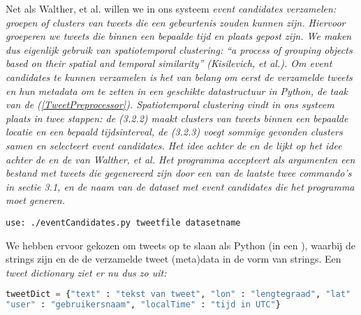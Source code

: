 {{Net als Walther, et al. willen we in ons systeem \it{event candidates} verzamelen: 
groepen of clusters van tweets die een gebeurtenis zouden kunnen zijn. Hiervoor 
groeperen we tweets die binnen een bepaalde tijd en plaats gepost zijn. We maken 
dus eigenlijk gebruik van \it{spatiotemporal clustering}: \it{“a process of grouping 
objects based on their spatial and temporal similarity”} (Kisilevich, et al.). 
\vl
Om event candidates te kunnen verzamelen is het van belang om eerst de 
verzamelde tweets en hun metadata om te zetten in een geschikte datastructuur in 
Python, de taak van de  (\ref{TweetPreprocessor}). Spatiotemporal clustering 
vindt in ons systeem plaats in twee stappen: de  (3.2.2) maakt 
clusters van tweets binnen een bepaalde locatie en een bepaald tijdsinterval, de 
 (3.2.3) voegt sommige gevonden clusters samen en selecteert event 
candidates.  Het idee achter de  en de  lijkt op het 
idee achter de  en de  van Walther, et al.
\vl
Het programma  accepteert als argumenten een bestand met tweets 
die gegenereerd zijn door een van de laatste twee commando's in sectie 3.1, en 
de naam van de dataset met event candidates die het programma moet generen.

\begin{lstlisting}
use: ./eventCandidates.py tweetfile datasetname
\end{lstlisting}
\vspace*{-10pt}

\label{TweetPreprocessor}

We hebben ervoor gekozen om tweets op te slaan als Python  (in een 
), waarbij de  strings zijn en de  de verzamelde tweet (meta)data 
in de vorm van strings. Een \it{tweet dictionary} ziet er nu dus zo uit:

\begin{lstlisting}[language=Python]
tweetDict = {"text" : "tekst van tweet", "lon" : "lengtegraad", "lat" : "breedtegraad", 
"user" : "gebruikersnaam", "localTime" : "tijd in UTC"}
\end{lstlisting}

}}
